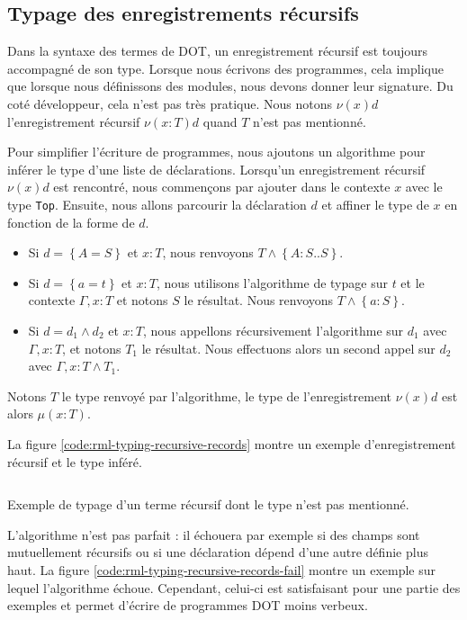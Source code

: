 
\subsection*{Typage des enregistrements récursifs}

Dans la syntaxe des termes de DOT, un enregistrement récursif est toujours accompagné de
son type. Lorsque nous écrivons des programmes, cela implique que lorsque nous
définissons des modules, nous devons donner leur signature. Du
coté développeur, cela n'est pas très pratique. Nous notons $\nu(x) d$
l'enregistrement récursif $\nu(x : T) d$ quand $T$ n'est pas mentionné.

Pour simplifier l'écriture de programmes, nous ajoutons un
algorithme pour inférer le type d'une liste de
déclarations. Lorsqu'un enregistrement récursif $\nu(x) d$ est rencontré,
nous commençons par ajouter dans le contexte $x$ avec le type \verb|Top|.
Ensuite, nous allons parcourir la déclaration $d$ et affiner le type de $x$ en
fonction de la forme de $d$.
\begin{itemize}
\item Si $d = \left\{ A = S \right\}$ et $x : T$, nous renvoyons $T \wedge
  \left\{ A : S .. S \right\}$.
\item Si $d = \left\{ a = t \right\}$ et $x : T$, nous utilisons l'algorithme de
  typage sur $t$ et le contexte $\Gamma, x : T$ et notons $S$ le résultat. Nous
  renvoyons $T \wedge \left\{ a : S \right\}$.
\item Si $d = d_{1} \wedge d_{2}$ et $x : T$, nous appellons récursivement
  l'algorithme sur $d_{1}$ avec $\Gamma, x : T$, et notons $T_{1}$ le résultat. Nous
  effectuons alors un second appel sur $d_{2}$ avec $\Gamma, x : T \wedge T_{1}$.
\end{itemize}
Notons $T$ le type renvoyé par l'algorithme, le type de l'enregistrement $\nu(x)
d$ est alors $\mu(x : T)$.

La figure \ref{code:rml-typing-recursive-records} montre un exemple
d'enregistrement récursif et le type inféré.

\begin{listing}
  \inputminted{OCaml}{codes/typing_recursive_records.rml}
  \caption{Exemple de typage d'un terme récursif dont le type n'est pas
    mentionné.}
  \label{code:rml-typing-recursive-records}
\end{listing}

L'algorithme n'est pas parfait : il échouera par exemple si des champs sont
mutuellement récursifs ou si une déclaration dépend d'une autre définie plus haut. La figure \ref{code:rml-typing-recursive-records-fail}
montre un exemple sur lequel l'algorithme échoue.
Cependant, celui-ci est satisfaisant pour une partie des exemples et permet
d'écrire de programmes DOT moins verbeux.

